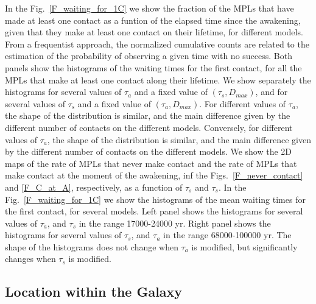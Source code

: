 \documentclass[crop]{CSLB}%
\begin{document}
In the Fig.~\ref{F_waiting_for_1C} we show the fraction of the MPLs
that have made at least one contact as a funtion of the elapsed time
since the awakening, given that they make at least one contact on
their lifetime, for different models.
%
From a frequentist approach, the normalized cumulative counts are
related to the estimation of the probability of observing a given time
with no success.
%             
Both panels show the histograms of the waiting times for the first
contact, for all the MPLs that make at least one contact along their
lifetime.
%
We show separately the histograms for several values of $\tau_a$ and a
fixed value of $(\tau_s, D_{max})$, and for several values of $\tau_s$
and a fixed value of $(\tau_a, D_{max})$.
%
For different values of $\tau_a$, the shape of the distribution is
similar, and the main difference given by the different number of
contacts on the different models.
%
Conversely, for different values of $\tau_a$, the shape of the
distribution is similar, and the main difference given by the
different number of contacts on the different models. 
%
We show the 2D maps of the rate of MPLs that never make contact and
the rate of MPLs that make contact at the moment of the awakening,
inf the Figs.~\ref{F_never_contact} and \ref{F_C_at_A}, respectively,
as a function of $\tau_s$ and $\tau_s$.
%
In the Fig.~\ref{F_waiting_for_1C} we show the histograms of the mean
waiting times for the first contact, for several models.
%
Left panel shows the histograms for several values of $\tau_a$, and
$\tau_s$ in the range 17000-24000 yr.
%
Right panel shows the histograms for several values of $\tau_s$, and
$\tau_a$ in the range 68000-100000 yr.
%
The shape of the histograms does not change when $\tau_a$ is modified,
but significantly changes when $\tau_s$ is modified.


                   
           

\subsection{Location within the Galaxy}\label{SS_location}
    
\end{document}
